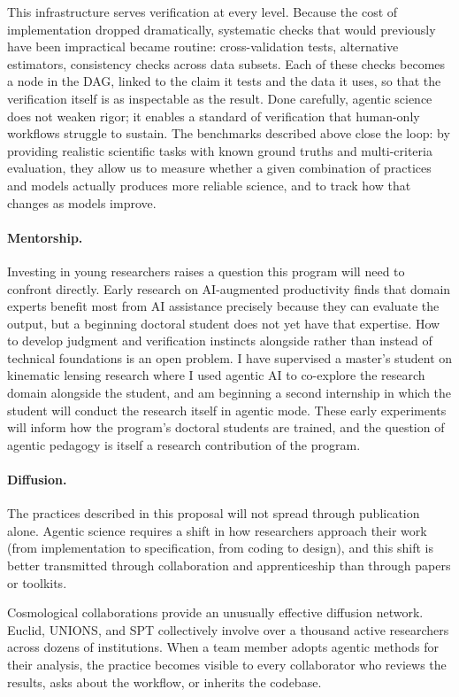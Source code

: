\documentclass[11pt, a4paper]{article}
\begin{document}
This infrastructure serves verification at every level.
Because the cost of implementation dropped dramatically, systematic checks that would previously have been impractical became routine: cross-validation tests, alternative estimators, consistency checks across data subsets.
Each of these checks becomes a node in the DAG, linked to the claim it tests and the data it uses, so that the verification itself is as inspectable as the result.
Done carefully, agentic science does not weaken rigor; it enables a standard of verification that human-only workflows struggle to sustain.
The benchmarks described above close the loop: by providing realistic scientific tasks with known ground truths and multi-criteria evaluation, they allow us to measure whether a given combination of practices and models actually produces more reliable science, and to track how that changes as models improve.

\paragraph{Mentorship.}
Investing in young researchers raises a question this program will need to confront directly.
Early research on AI-augmented productivity finds that domain experts benefit most from AI assistance precisely because they can evaluate the output, but a beginning doctoral student does not yet have that expertise.
How to develop judgment and verification instincts alongside rather than instead of technical foundations is an open problem.
I have supervised a master's student on kinematic lensing research where I used agentic AI to co-explore the research domain alongside the student, and am beginning a second internship in which the student will conduct the research itself in agentic mode.
These early experiments will inform how the program's doctoral students are trained, and the question of agentic pedagogy is itself a research contribution of the program.

\paragraph{Diffusion.}
The practices described in this proposal will not spread through publication alone.
Agentic science requires a shift in how researchers approach their work (from implementation to specification, from coding to design), and this shift is better transmitted through collaboration and apprenticeship than through papers or toolkits.

Cosmological collaborations provide an unusually effective diffusion network.
Euclid, UNIONS, and SPT collectively involve over a thousand active researchers across dozens of institutions.
When a team member adopts agentic methods for their analysis, the practice becomes visible to every collaborator who reviews the results, asks about the workflow, or inherits the codebase.
\end{document}
